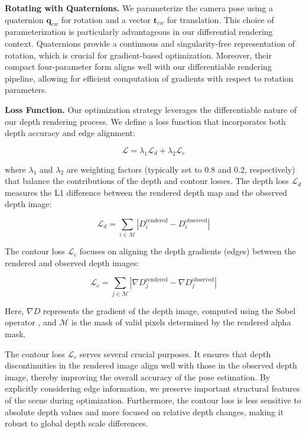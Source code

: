 \documentclass[twocolumn]{article}
\begin{document}
\textbf{Rotating with
Quaternions.}\autocite{kuipersQuaternionsRotationSequences1999} We
parameterize the camera pose using a quaternion \(\mathbf{q}_{cw}\) for
rotation and a vector \(\mathbf{t}_{cw}\) for translation. This choice
of parameterization is particularly advantageous in our differential
rendering context. Quaternions provide a continuous and singularity-free
representation of rotation, which is crucial for gradient-based
optimization. Moreover, their compact four-parameter form aligns well
with our differentiable rendering pipeline, allowing for efficient
computation of gradients with respect to rotation parameters.

\textbf{Loss Function.} Our optimization strategy leverages the
differentiable nature of our depth rendering process. We define a loss
function that incorporates both depth accuracy and edge alignment:

\[
\mathcal{L} = \lambda_1 \mathcal{L}_d + \lambda_2 \mathcal{L}_c
\]

where \(\lambda_1\) and \(\lambda_2\) are weighting factors (typically
set to 0.8 and 0.2, respectively) that balance the contributions of the
depth and contour losses. The depth loss \(\mathcal{L}_d\) measures the
L1 difference between the rendered depth map and the observed depth
image:

\[
\mathcal{L}_d = \sum_{i \in \mathcal{M}} \left| D_i^{\text{rendered}} - D_i^{\text{observed}} \right|
\]

The contour loss \(\mathcal{L}_c\) focuses on aligning the depth
gradients (edges) between the rendered and observed depth images:

\[
\mathcal{L}_c = \sum_{j \in \mathcal{M}} \left| \nabla D_j^{\text{rendered}} - \nabla D_j^{\text{observed}} \right|
\]

Here, \(\nabla D\) represents the gradient of the depth image, computed
using the Sobel operator \autocite{kanopoulosDesignImageEdge1988}, and
\(\mathcal{M}\) is the mask of valid pixels determined by the rendered
alpha mask.

The contour loss \(\mathcal{L}_{c}\) serves several crucial purposes. It
ensures that depth discontinuities in the rendered image align well with
those in the observed depth image, thereby improving the overall
accuracy of the pose estimation. By explicitly considering edge
information, we preserve important structural features of the scene
during optimization. Furthermore, the contour loss is less sensitive to
absolute depth values and more focused on relative depth changes, making
it robust to global depth scale differences.
\end{document}
